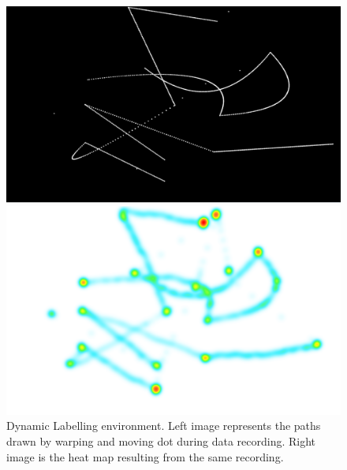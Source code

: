 \begin{figure}
    \centering
    \begin{minipage}{0.5\textwidth}
        \centering
        \includegraphics[width=\textwidth]{Images/Labelling/DynamicEnvScreen.png} %
    \end{minipage}\hfill
    \begin{minipage}{0.5\textwidth}
        \centering
        \includegraphics[width=\textwidth]{Images/Labelling/DynamicEnvHm.png}%
    \end{minipage}
    \caption{Dynamic Labelling environment. Left image represents the paths drawn by warping and moving dot during data recording. Right image is the heat map resulting from the same recording.}
    \label{fig:meth_DynamicLabellingEnv}
\end{figure}
